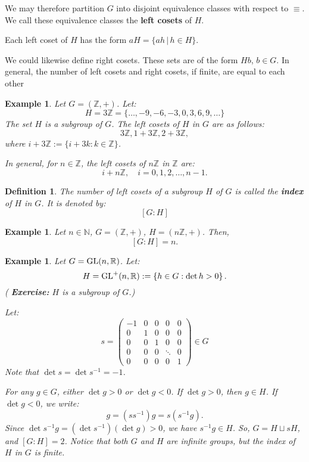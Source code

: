 \documentclass[a4paper,12pt]{report}
\newcounter{statement}
\numberwithin{statement}{chapter}
\newtheorem{defn}[statement]{Definition}
\newtheorem{eg}[statement]{\bf Example}
\numberwithin{equation}{chapter}
\numberwithin{section}{chapter}
\numberwithin{subsection}{section}
\begin{document}
We may therefore partition $G$
into disjoint equivalence classes with respect to $\equiv$.
We call these equivalence classes the  {\bf left cosets}  of $H$.



Each left coset of $H$ has the form $aH = \{ah \,|\, h \in H\}$.




We could likewise define  right cosets.  These sets are of the form $Hb$, $b \in G$.
In general,
the number of left cosets and right cosets, if finite, are equal to each other


\begin{eg}
Let $G = (\mathbb{Z}, +)$.
Let:
\[
H = 3\mathbb{Z} =
\{\ldots, -9, -6, -3, 0, 3, 6, 9, \ldots\}
\]
The set $H$ is a subgroup of $G$.
The left cosets of $H$ in $G$ are as follows:
\[
3\mathbb{Z}, 1 + 3\mathbb{Z}, 2 + 3\mathbb{Z},
\]
where $i + 3\mathbb{Z} := \{i + 3k : k \in \mathbb{Z}\}$.



In general, for $n \in \mathbb{Z}$,
the left cosets of $n\mathbb{Z}$ in $\mathbb{Z}$ are:
\[
i + n\mathbb{Z}, \quad i = 0, 1, 2, \ldots, n - 1.
\]
\end{eg}

\begin{defn}
The number of left cosets of a subgroup $H$ of $G$ is called the  {\bf index}  of $H$ in $G$.
It is denoted by:
\[
[G : H]
\]
\end{defn}
\begin{eg}
Let $n \in \mathbb{N}$, 
$G = (\mathbb{Z}, +)$, $H = (n\mathbb{Z}, +)$.
Then,
\[
[G:H] = n.
\]
\end{eg}

\begin{eg}
Let $G = {\rm GL}(n, \mathbb{R})$.  Let:
\[
H = {\rm GL}^+(n, \mathbb{R}) := \left\{ h \in G : \det h > 0\right\}.
\]
( {\bf Exercise:}  $H$ is a subgroup of $G$.)



Let:
\[
s = \left(
\begin{matrix}
-1 & 0 & 0& 0 & 0\\
0&1 &0 &0 &0\\
0&0 &1 &0 &0\\
0&0 &0 &\ddots&0\\
0& 0 &0 &0 &1
\end{matrix}
\right) \in G
\]
Note that $\det s = \det s^{-1} = -1$.



For any $g \in G$, either $\det g > 0$ or $\det g < 0$.
If $\det g > 0$, then $g \in H$.
If $\det g < 0$, we write:
\[
g = (ss^{-1}) g = s(s^{-1} g).
\]
Since $\det s^{-1}g = (\det s^{-1})(\det g) > 0$, we have $s^{-1}g \in H$.
So, $G = H \sqcup s H$, and $[G : H] = 2$.
Notice that both $G$ and $H$ are infinite groups, but the index of $H$ in $G$ is finite.
\end{eg}
\end{document}
